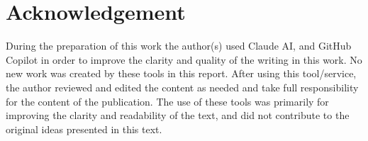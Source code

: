 \section{Acknowledgement}\label{sec:acknowledgement}

During the preparation of this work the author(s) used Claude AI, and GitHub Copilot in order to improve the clarity and quality of the writing in this work.
No new work was created by these tools in this report.
After using this tool/service, the author reviewed and edited the content as needed and take full responsibility for the content of the publication.
The use of these tools was primarily for improving the clarity and readability of the text, and did not contribute to the original ideas presented in this text.
